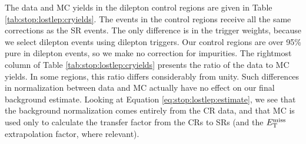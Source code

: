 The data and MC yields in the dilepton control regions are given in
Table \ref{tab:stop:lostlep:cryields}. The events in the control
regions receive all the same corrections as the SR
events. The only difference is in the trigger weights, because we
select dilepton events using dilepton triggers.
Our control regions are over 95\% pure in dilepton events,
so we make no correction for impurities. The rightmost column of Table
\ref{tab:stop:lostlep:cryields} presents the ratio of the data to MC
yields. In some regions, this ratio differs considerably from
unity. Such differences in normalization between data and MC
actually have no effect on our final background estimate. Looking at Equation
\ref{eq:stop:lostlep:estimate}, we see that the background
normalization comes entirely from the CR data, and that MC is used
only to calculate the transfer factor from the CRs to SRs (and the
$E_\text{T}^\text{miss}$ extrapolation factor, where relevant).

